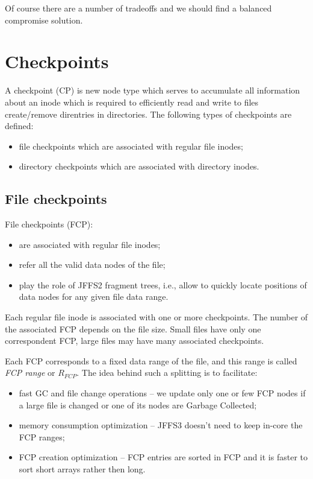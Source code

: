 \documentclass[12pt,a4paper,oneside,titlepage]{article}
\begin{document}
Of course there are a number of tradeoffs and we should find a balanced compromise
solution.

%
%
\section{Checkpoints}
A checkpoint (CP) is new node type which serves to accumulate all
information about an inode which is required to efficiently read and
write to files create/remove direntries in directories. The following
types of checkpoints are defined:

\begin{itemize}
\item file checkpoints which are associated with regular file inodes;
\item directory checkpoints which are associated with directory inodes.
\end{itemize}

%
%
\subsection{File checkpoints}
File checkpoints (FCP):
\begin{itemize}
\item are associated with regular file inodes;
\item refer all the valid data nodes of the file;
\item play the role of JFFS2 fragment trees, i.e., allow to quickly locate
positions of data nodes for any given file data range.
\end{itemize}

Each regular file inode is associated with one or more
checkpoints. The number of the associated FCP depends on the file size.
Small files have only one correspondent FCP, large files may have many
associated checkpoints.

Each FCP corresponds to a fixed data range of the file, and
this range is called \emph{FCP range} or $R_{FCP}$.
The idea behind such a splitting is to facilitate:
\begin{itemize}
\item fast GC and file change operations -- we update only one or few FCP nodes if
a large file is changed or one of its nodes are Garbage Collected;
\item memory consumption optimization -- JFFS3 doesn't need to keep in-core
the FCP ranges;
\item FCP creation optimization -- FCP entries are sorted in FCP and
it is faster to sort short arrays rather then long.
\end{itemize}
\end{document}
